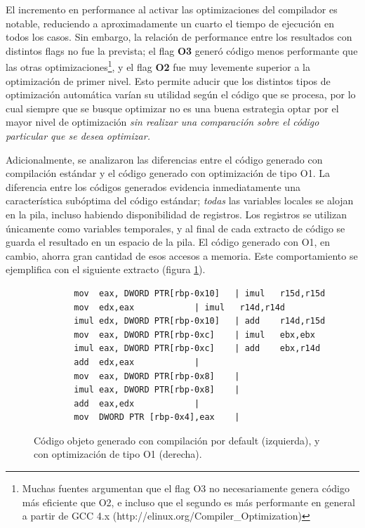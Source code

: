 El incremento en performance al activar las optimizaciones del compilador es notable, reduciendo a aproximadamente un cuarto el tiempo de ejecución en todos los casos. Sin embargo, la relación de performance entre los resultados con distintos flags no fue la prevista; el flag \textbf{O3} generó código menos performante que las otras optimizaciones\footnote{Muchas fuentes argumentan que el flag O3 no necesariamente genera código más eficiente que O2, e incluso que el segundo es más performante en general a partir de GCC 4.x (http://elinux.org/Compiler\_Optimization)}, y el flag \textbf{O2} fue muy levemente superior a la optimización de primer nivel. Esto permite aducir que los distintos tipos de optimización automática varían su utilidad según el código que se procesa, por lo cual siempre que se busque optimizar no es una buena estrategia optar por el mayor nivel de optimización \emph{sin realizar una comparación sobre el código particular que se desea optimizar.}

Adicionalmente, se analizaron las diferencias entre el código generado con compilación estándar y el código generado con optimización de tipo O1. La diferencia entre los códigos generados evidencia inmediatamente una característica subóptima del código estándar; \emph{todas} las variables locales se alojan en la pila, incluso habiendo disponibilidad de registros. Los registros se utilizan únicamente como variables temporales, y al final de cada extracto de código se guarda el resultado en un espacio de la pila. El código generado con O1, en cambio, ahorra gran cantidad de esos accesos a memoria. Este comportamiento se ejemplifica con el siguiente extracto (figura \ref{fig:codigo-objeto-filtro-color}).


\begin{figure}[h]
	\begin{mdframed}
	\begin{center}
		\begin{lstlisting}
		mov  eax, DWORD PTR[rbp-0x10]	| imul   r15d,r15d
		mov  edx,eax			| imul   r14d,r14d
		imul edx, DWORD PTR[rbp-0x10]	| add    r14d,r15d
		mov  eax, DWORD PTR[rbp-0xc]	| imul   ebx,ebx
		imul eax, DWORD PTR[rbp-0xc]	| add    ebx,r14d
		add  edx,eax			|			
		mov  eax, DWORD PTR[rbp-0x8]	|			
		imul eax, DWORD PTR[rbp-0x8]	|			
		add  eax,edx			|			
		mov  DWORD PTR [rbp-0x4],eax	|			
		\end{lstlisting}
	\end{center}
	\end{mdframed}
	\caption{Código objeto generado con compilación por default (izquierda), y con optimización de tipo O1 (derecha).}
	\label{fig:codigo-objeto-filtro-color}
\end{figure}

